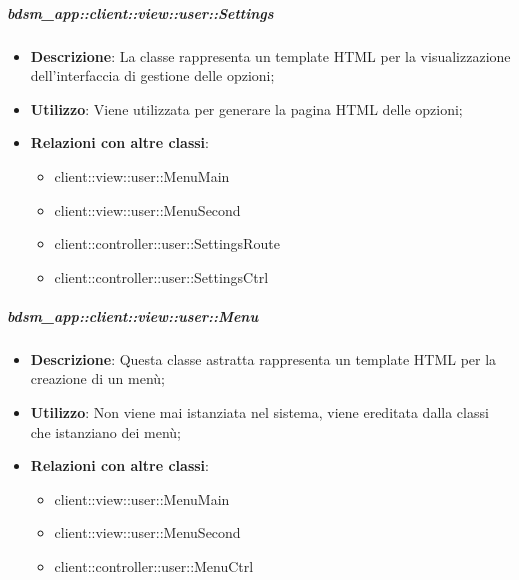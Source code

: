 		\subparagraph{bdsm\_app::client::view::user::Settings} %
		\label{subp:bdsm_app_client_view_user_settings}
			\begin{itemize}
				\item \textbf{Descrizione}: La classe rappresenta un template HTML per la visualizzazione dell'interfaccia di gestione delle opzioni;
				\item \textbf{Utilizzo}: Viene utilizzata per generare la pagina HTML delle opzioni;
				\item \textbf{Relazioni con altre classi}:
					\begin{itemize}
						\item client::view::user::MenuMain
						\item client::view::user::MenuSecond
						\item client::controller::user::SettingsRoute
						\item client::controller::user::SettingsCtrl
					\end{itemize}
			\end{itemize}

		\subparagraph{bdsm\_app::client::view::user::Menu} %
		\label{subp:bdsm_app_client_view_user_menu}
			\begin{itemize}
				\item \textbf{Descrizione}: Questa classe astratta rappresenta un template HTML per la creazione di un menù;
				\item \textbf{Utilizzo}: Non viene mai istanziata nel sistema, viene ereditata dalla classi che istanziano dei menù;
				\item \textbf{Relazioni con altre classi}:
					\begin{itemize}
						\item client::view::user::MenuMain
						\item client::view::user::MenuSecond
						\item client::controller::user::MenuCtrl
					\end{itemize}
			\end{itemize}

